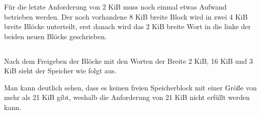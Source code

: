         

    \subsubsection{}
        

    \subsubsection{}
        F\"{u}r die letzte Anforderung von 2 KiB muss noch einmal etwas Aufwand betrieben werden.
        Der noch vorhandene 8 KiB breite Block wird in zwei 4 KiB breite Bl\"{o}cke unterteilt, erst danach wird das 2 KiB breite Wort in die linke der beiden neuen Bl\"{o}cke geschrieben.
        

\subsection{}
    Nach dem Freigeben der Bl\"{o}cke mit den Worten der Breite 2 KiB, 16 KiB und 3 KiB sieht der Speicher wie folgt aus.

    

    Man kann deutlich sehen, dass es keinen freien Speicherblock mit einer Gr\"{o}\ss{}e von mehr als 21 KiB gibt, weshalb die Anforderung von 21 KiB nicht erf\"{u}llt werden kann.
